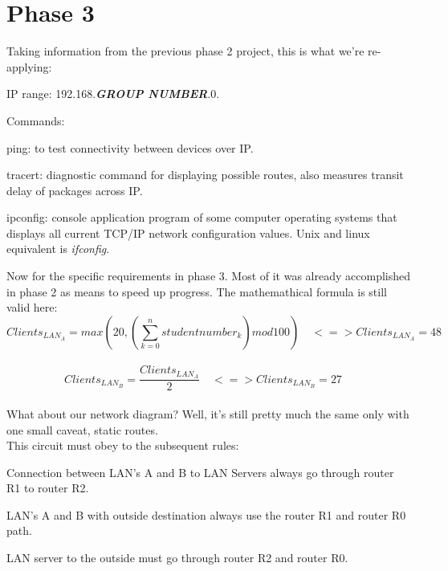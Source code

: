 \documentclass[11pt,a4paper]{report}
\begin{document}
    \setcounter{page}{1}

\chapter{Phase 3}
    Taking information from the previous phase 2 project, this is what we're re-applying:\\
    \begin{compactitem}
        \item IP range: 192.168.\textbf{\textit{GROUP NUMBER}}.0.
        \item Commands:
        \begin{compactitem}
            \item ping: to test connectivity between devices over IP.
            \item tracert: diagnostic command for displaying possible routes, also measures transit delay of packages across IP.
            \item ipconfig: console application program of some computer operating systems that displays all current TCP/IP network configuration values. Unix and linux equivalent is \textit{ifconfig}.
        \end{compactitem}
    \end{compactitem}

    Now for the specific requirements in phase 3. Most of it was already accomplished in phase 2 as means to speed up progress.
    The mathemathical formula is still valid here:\\
    \[
        Clients_{LAN_A} = max\left(20, \left(\sum_{k=0}^n studentnumber_k\right)mod 100\right)\quad <=> 
        Clients_{LAN_A} = 48\quad
    \] \\
    \[
        Clients_{LAN_B} = \frac{Clients_{LAN_A}}{2}\quad <=>
        Clients_{LAN_B} = 27\quad
    \]\\

    What about our network diagram? Well, it's still pretty much the same only with one small caveat, static routes.\\
    This circuit must obey to the subsequent rules:\\
    \begin{compactitem}
        \item Connection between LAN's A and B to LAN Servers always go through router R1 to router R2.
        \item LAN's A and B with outside destination always use the router R1 and router R0 path.
        \item LAN server to the outside must go through router R2 and router R0.
    \end{compactitem}
\end{document}
